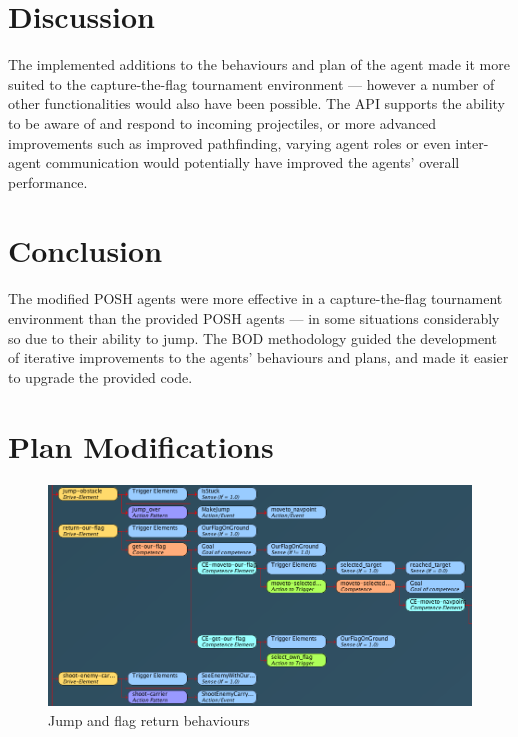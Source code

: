 \documentclass[a4paper,12pt]{article}
\begin{document}
\section{Discussion}
The implemented additions to the behaviours and plan of the agent made it more suited to the capture-the-flag tournament environment --- however a number of other functionalities would also have been possible. The API supports the ability to be aware of and respond to incoming projectiles, or more advanced improvements such as improved pathfinding, varying agent roles or even inter-agent communication would potentially have improved the agents' overall performance. 

\section{Conclusion}
The modified POSH agents were more effective in a capture-the-flag tournament environment than the provided POSH agents --- in some situations considerably so due to their ability to jump. The BOD methodology guided the development of iterative improvements to the agents' behaviours and plans, and made it easier to upgrade the provided code.


% 
% 

\appendix
\section{Plan Modifications}\label{sec:app_plan}
\begin{figure}[h!]
	\centering
	\includegraphics[width=\linewidth]{additions1}
	\caption{Jump and flag return behaviours}
	\label{fig:additions1}
\end{figure}
\end{document}
